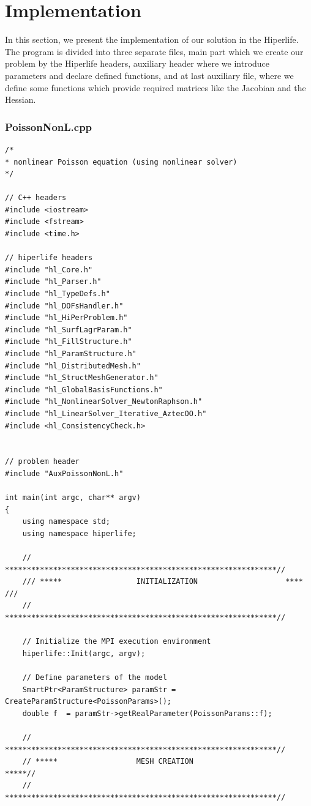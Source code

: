 \documentclass[]{article}
\begin{document}
\section{Implementation} \label{sec: imp}
In this section, we present the implementation of our solution in the Hiperlife. The program is divided into three separate files, main part which we create our problem by the Hiperlife headers, auxiliary header where we introduce parameters and declare defined functions, and at last auxiliary file, where we define some functions which provide required matrices like the Jacobian and the Hessian.
\subsubsection{PoissonNonL.cpp} \label{sec: m.cpp}
\nolinenumbers
\begin{lstlisting}
/*
* nonlinear Poisson equation (using nonlinear solver)
*/

// C++ headers
#include <iostream>
#include <fstream>
#include <time.h>

// hiperlife headers
#include "hl_Core.h"
#include "hl_Parser.h"
#include "hl_TypeDefs.h"  
#include "hl_DOFsHandler.h"
#include "hl_HiPerProblem.h"
#include "hl_SurfLagrParam.h"
#include "hl_FillStructure.h"
#include "hl_ParamStructure.h"
#include "hl_DistributedMesh.h" 
#include "hl_StructMeshGenerator.h" 
#include "hl_GlobalBasisFunctions.h"
#include "hl_NonlinearSolver_NewtonRaphson.h"
#include "hl_LinearSolver_Iterative_AztecOO.h"
#include <hl_ConsistencyCheck.h>


// problem header
#include "AuxPoissonNonL.h"

int main(int argc, char** argv)
{
	using namespace std;
	using namespace hiperlife;
	
	// **************************************************************//
	/// *****                 INITIALIZATION                    **** ///
	// **************************************************************//
	
	// Initialize the MPI execution environment
	hiperlife::Init(argc, argv);
	
	// Define parameters of the model
	SmartPtr<ParamStructure> paramStr = CreateParamStructure<PoissonParams>();
	double f  = paramStr->getRealParameter(PoissonParams::f);
	
	// **************************************************************//
	// *****                  MESH CREATION                     *****//
	// **************************************************************//
	

\end{lstlisting}
\end{document}
